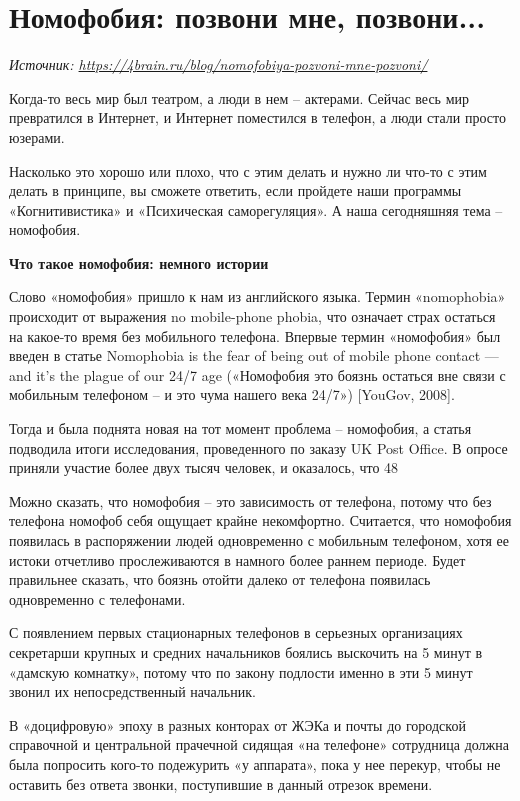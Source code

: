 \newpage
\section{Номофобия: позвони мне, позвони...}

\textit{Источник: \url{https://4brain.ru/blog/nomofobiya-pozvoni-mne-pozvoni/}}

Когда-то весь мир был театром, а люди в нем – актерами. Сейчас весь мир превратился в Интернет, и Интернет поместился в телефон, а люди стали просто юзерами.

Насколько это хорошо или плохо, что с этим делать и нужно ли что-то с этим делать в принципе, вы сможете ответить, если пройдете наши программы «Когнитивистика» и «Психическая саморегуляция». А наша сегодняшняя тема – номофобия.

\textbf{Что такое номофобия: немного истории}

Слово «номофобия» пришло к нам из английского языка. Термин «nomophobia» происходит от выражения no mobile-phone phobia, что означает страх остаться на какое-то время без мобильного телефона. Впервые термин «номофобия» был введен в статье Nomophobia is the fear of being out of mobile phone contact — and it’s the plague of our 24/7 age («Номофобия это боязнь остаться вне связи с мобильным телефоном – и это чума нашего века 24/7») [YouGov, 2008].

Тогда и была поднята новая на тот момент проблема – номофобия, а статья подводила итоги исследования, проведенного по заказу UK Post Office. В опросе приняли участие более двух тысяч человек, и оказалось, что 48%

Можно сказать, что номофобия – это зависимость от телефона, потому что без телефона номофоб себя ощущает крайне некомфортно. Считается, что номофобия появилась в распоряжении людей одновременно с мобильным телефоном, хотя ее истоки отчетливо прослеживаются в намного более раннем периоде. Будет правильнее сказать, что боязнь отойти далеко от телефона появилась одновременно с телефонами.

С появлением первых стационарных телефонов в серьезных организациях секретарши крупных и средних начальников боялись выскочить на 5 минут в «дамскую комнатку», потому что по закону подлости именно в эти 5 минут звонил их непосредственный начальник.

В «доцифровую» эпоху в разных конторах от ЖЭКа и почты до городской справочной и центральной прачечной сидящая «на телефоне» сотрудница должна была попросить кого-то подежурить «у аппарата», пока у нее перекур, чтобы не оставить без ответа звонки, поступившие в данный отрезок времени.

